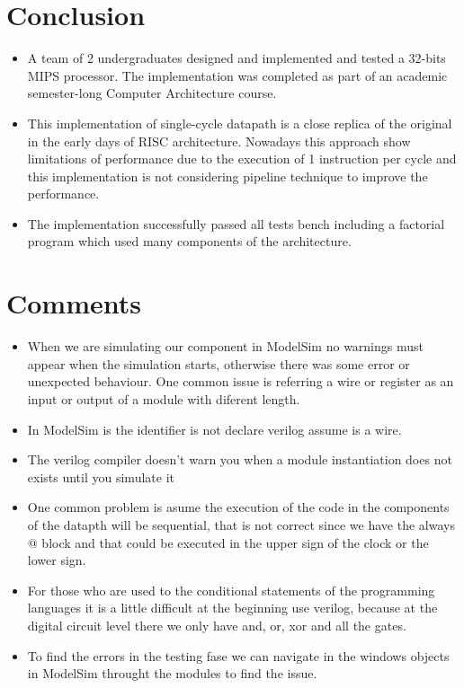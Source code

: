 \documentclass[conference]{IEEEtran}
\begin{document}
\section{Conclusion}
\begin{itemize}
\item A team of 2 undergraduates designed and implemented and tested a 32-bits MIPS processor. The implementation was completed as part of an academic semester-long Computer Architecture course.
\item This implementation of single-cycle datapath is a close replica of the original in the early days of RISC architecture. Nowadays this approach show limitations of performance due to the execution of 1 instruction per cycle and this implementation is not considering pipeline technique to improve the performance.
\item The implementation successfully passed all tests bench including a factorial program which used many components of the architecture.
\end{itemize}
\section{Comments}
\begin{itemize}
\item When we are simulating our component in ModelSim no warnings must appear when the 
simulation starts, otherwise there was some error or unexpected behaviour. One common 
issue is referring a wire or register as an input or output of a module with diferent length.
\item In ModelSim is the identifier is not declare verilog assume is a wire.
\item The verilog compiler doesn't warn you when a module  instantiation does not exists until you simulate it
\item One common problem is asume the execution of the code in the components of the datapth will be sequential, 
that is not correct since we have the always @ block and that could be executed in the upper sign of the clock 
or the lower sign.
\item For those who are used to the conditional statements of the programming languages it is a little difficult at the 
beginning use verilog, because at the digital circuit level there we only have and, or, xor and all the gates.
\item To find the errors in the testing fase we can navigate in the windows objects in ModelSim throught the modules
to find the issue.
\end{itemize}
\end{document}
